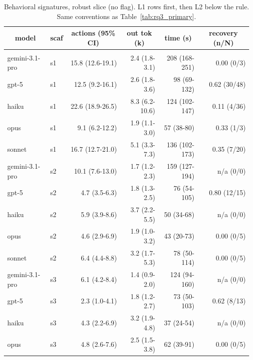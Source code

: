 \documentclass[10pt]{article} %
\begin{document}
\FloatBarrier

    \begin{table}[h]
        \caption{Behavioral signatures, robust slice (no flag). L1 rows first, then L2 below the rule. Same conventions as Table~\ref{tab:rq3_primary}.}
    \label{tab:rq3_robust}
    \begin{center}
    \footnotesize
    \begin{tabular}{llrrrr}
        \multicolumn{1}{c}{\bf model} & \multicolumn{1}{c}{\bf scaf} & \multicolumn{1}{c}{\bf actions (95\% CI)} & \multicolumn{1}{c}{\bf out tok (k)} & \multicolumn{1}{c}{\bf time (s)} & \multicolumn{1}{c}{\bf recovery (n/N)} \\
        \hline \\
        gemini-3.1-pro & s1 & 15.8 (12.6-19.1) & 2.4 (1.8-3.1)  & 208 (168-251) & 0.00 (0/3) \\
        gpt-5          & s1 & 12.5 (9.2-16.1)  & 2.6 (1.8-3.6)  & 98 (69-132)   & 0.62 (30/48) \\
        haiku          & s1 & 22.6 (18.9-26.5) & 8.3 (6.2-10.6) & 124 (102-147) & 0.11 (4/36) \\
        opus           & s1 & 9.1 (6.2-12.2)   & 1.9 (1.1-3.0)  & 57 (38-80)    & 0.33 (1/3) \\
        sonnet         & s1 & 16.7 (12.7-21.0) & 5.1 (3.3-7.3)  & 136 (102-173) & 0.35 (7/20) \\
        gemini-3.1-pro & s2 & 10.1 (7.6-13.0)  & 1.7 (1.2-2.3)  & 159 (127-194) & n/a (0/0) \\
        gpt-5          & s2 & 4.7 (3.5-6.3)    & 1.8 (1.3-2.5)  & 76 (54-105)   & 0.80 (12/15) \\
        haiku          & s2 & 5.9 (3.9-8.6)    & 3.7 (2.2-5.5)  & 50 (34-68)    & n/a (0/0) \\
        opus           & s2 & 4.6 (2.9-6.9)    & 1.9 (1.0-3.2)  & 43 (20-73)    & 0.00 (0/5) \\
        sonnet         & s2 & 6.4 (4.4-8.8)    & 3.2 (1.7-5.3)  & 78 (50-114)   & 0.00 (0/5) \\
        gemini-3.1-pro & s3 & 6.1 (4.2-8.4)    & 1.4 (0.9-2.0)  & 124 (94-160)  & n/a (0/0) \\
        gpt-5          & s3 & 2.3 (1.0-4.1)    & 1.8 (1.2-2.7)  & 73 (50-103)   & 0.62 (8/13) \\
        haiku          & s3 & 4.3 (2.2-6.9)    & 3.2 (1.9-4.8)  & 37 (24-54)    & n/a (0/0) \\
        opus           & s3 & 4.8 (2.6-7.6)    & 2.5 (1.5-3.8)  & 62 (39-91)    & 0.00 (0/5) \\

\end{tabular}
\end{center}
\end{table}
\end{document}
